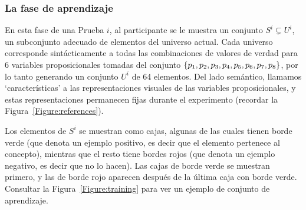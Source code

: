 \subsubsection{La fase de aprendizaje}\label{Subsection:learning}

En esta fase de una Prueba $ i $, al participante se le muestra un conjunto $ S^i \subsetneq U^i $, un subconjunto adecuado de elementos del universo actual. Cada universo corresponde sintácticamente a todas las combinaciones de valores de verdad para 6 variables proposicionales tomadas del conjunto $\{p_1, p_2, p_3, p_4, p_5, p_6, p_7, p_8\}$, por lo tanto generando un conjunto $ U^i $ de 64 elementos. Del lado semántico, llamamos `características' a las representaciones visuales de las variables proposicionales, y estas representaciones permanecen fijas durante el experimento (recordar la Figura~\ref{Figure:references}).

Los elementos de $ S^i $ se muestran como cajas, algunas de las cuales tienen borde verde (que denota un ejemplo positivo, es decir que el elemento pertenece al concepto), mientras que el resto tiene bordes rojos (que denota un ejemplo negativo, es decir que no lo hacen). Las cajas de borde verde se muestran primero, y las de borde rojo aparecen después de la última caja con borde verde. Consultar la Figura~\ref{Figure:training} para ver un ejemplo de conjunto de aprendizaje.

